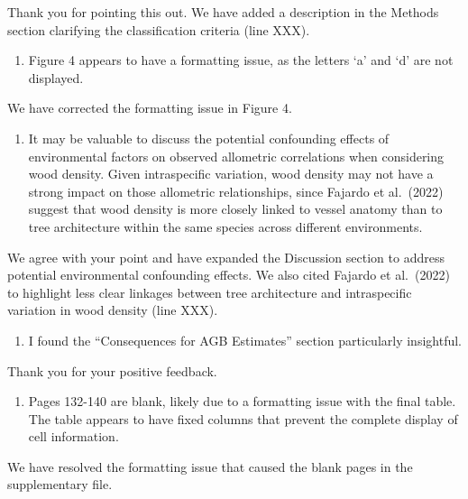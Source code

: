 \documentclass[
  12pt,
  letterpaper,
  DIV=11,
  numbers=noendperiod]{scrartcl}
\providecommand{\tightlist}{%
  \setlength{\itemsep}{0pt}\setlength{\parskip}{0pt}}\usepackage{longtable,booktabs,array}
\renewenvironment{quote}
  {\begin{customblockquote}\color{blockquote-text}\ignorespaces}
  {\end{customblockquote}}
\begin{document}
Thank you for pointing this out. We have added a description in the
Methods section clarifying the classification criteria (line XXX).

\begin{quote}
\begin{enumerate}
\def\labelenumi{\arabic{enumi})}
\setcounter{enumi}{1}
\tightlist
\item
  Figure 4 appears to have a formatting issue, as the letters `a' and
  `d' are not displayed.
\end{enumerate}
\end{quote}

We have corrected the formatting issue in Figure 4.

\begin{quote}
\begin{enumerate}
\def\labelenumi{\arabic{enumi})}
\setcounter{enumi}{2}
\tightlist
\item
  It may be valuable to discuss the potential confounding effects of
  environmental factors on observed allometric correlations when
  considering wood density. Given intraspecific variation, wood density
  may not have a strong impact on those allometric relationships, since
  Fajardo et al.~(2022) suggest that wood density is more closely linked
  to vessel anatomy than to tree architecture within the same species
  across different environments.
\end{enumerate}
\end{quote}

We agree with your point and have expanded the Discussion section to
address potential environmental confounding effects. We also cited
Fajardo et al.~(2022) to highlight less clear linkages between tree
architecture and intraspecific variation in wood density (line XXX).

\begin{quote}
\begin{enumerate}
\def\labelenumi{\arabic{enumi})}
\setcounter{enumi}{3}
\tightlist
\item
  I found the ``Consequences for AGB Estimates'' section particularly
  insightful.
\end{enumerate}
\end{quote}

Thank you for your positive feedback.

\begin{quote}
\begin{enumerate}
\def\labelenumi{\arabic{enumi})}
\setcounter{enumi}{4}
\tightlist
\item
  Pages 132-140 are blank, likely due to a formatting issue with the
  final table. The table appears to have fixed columns that prevent the
  complete display of cell information.
\end{enumerate}
\end{quote}

We have resolved the formatting issue that caused the blank pages in the
supplementary file.
\end{document}
